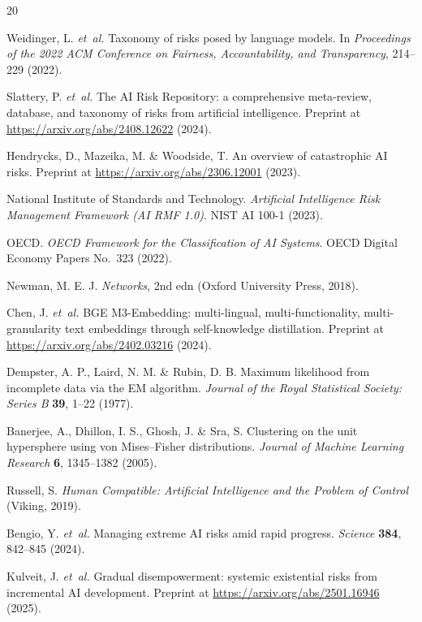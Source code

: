 \documentclass[fleqn,10pt]{wlscirep}
\begin{document}
\begin{thebibliography}{20}

Weidinger, L. \emph{et~al.}
Taxonomy of risks posed by language models.
In \emph{Proceedings of the 2022 ACM Conference on Fairness, Accountability, and Transparency}, 214--229 (2022).

Slattery, P. \emph{et~al.}
The AI Risk Repository: a comprehensive meta-review, database, and taxonomy of risks from artificial intelligence.
Preprint at \url{https://arxiv.org/abs/2408.12622} (2024).

Hendrycks, D., Mazeika, M. \& Woodside, T.
An overview of catastrophic AI risks.
Preprint at \url{https://arxiv.org/abs/2306.12001} (2023).

National Institute of Standards and Technology.
\emph{Artificial Intelligence Risk Management Framework (AI RMF 1.0)}.
NIST AI 100-1 (2023).

OECD.
\emph{OECD Framework for the Classification of AI Systems}.
OECD Digital Economy Papers No.~323 (2022).

Newman, M. E. J.
\emph{Networks}, 2nd edn (Oxford University Press, 2018).

Chen, J. \emph{et~al.}
BGE M3-Embedding: multi-lingual, multi-functionality, multi-granularity text embeddings through self-knowledge distillation.
Preprint at \url{https://arxiv.org/abs/2402.03216} (2024).

Dempster, A. P., Laird, N. M. \& Rubin, D. B.
Maximum likelihood from incomplete data via the EM algorithm.
\emph{Journal of the Royal Statistical Society: Series B} \textbf{39}, 1--22 (1977).

Banerjee, A., Dhillon, I. S., Ghosh, J. \& Sra, S.
Clustering on the unit hypersphere using von Mises--Fisher distributions.
\emph{Journal of Machine Learning Research} \textbf{6}, 1345--1382 (2005).

Russell, S.
\emph{Human Compatible: Artificial Intelligence and the Problem of Control}
(Viking, 2019).

Bengio, Y. \emph{et~al.}
Managing extreme AI risks amid rapid progress.
\emph{Science} \textbf{384}, 842--845 (2024).

Kulveit, J. \emph{et~al.}
Gradual disempowerment: systemic existential risks from incremental AI development.
Preprint at \url{https://arxiv.org/abs/2501.16946} (2025).


\end{thebibliography}
\end{document}
